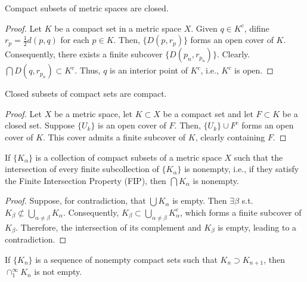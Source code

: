 \begin{theorem}[pma 2.34]
Compact subsets of metric spaces are closed.
\end{theorem}
\begin{proof}
Let $K$ be a compact set in a metric space $X$. Given $q\in K^c$, difine $r_p = \frac{1}{2}d(p,q)$ for each $p\in K$. Then, $\{D(p,r_p)\}$ forms an open cover of $K$. Consequently, there exists a finite subcover $\{D(p_n,r_{p_n})\}$. Clearly. $\bigcap D(q,r_{p_n}) \subset K^c$. Thus, $q$ is an interior point of $K^c$, i.e., $K^c$ is open.
\end{proof}

\begin{theorem}[pma 2.35] \label{thm:closed_subset_implies_compact}
Closed subsets of compact sets are compact.
\end{theorem}
\begin{proof}
Let $X$ be a metric space, let $K\subset X$ be a compact set and let $F\subset K$ be a closed set. Suppose $\{U_k\}$ is an open cover of $F$. Then, $\{U_k\} \cup F^c$ forms an open cover of $K$. This cover admits a finite subcover of $K$, clearly containing $F$.
\end{proof}

\begin{theorem}[pma 2.36] \label{thm:fip_implies_nonempty}
If $\{K_\alpha\}$ is a collection of compact subsets of a metric space $X$ such that the intersection of every finite subcollection of $\{K_\alpha\}$ is nonempty, i.e., if they satisfy the Finite Intersection Property (FIP), then $\bigcap K_\alpha$ is nonempty.
\end{theorem}
\begin{proof}
Suppose, for contradiction, that $\bigcup K_\alpha$ is empty. Then $\exists \beta$ s.t. $K_\beta \not\subset \bigcup_{\alpha\neq \beta}K_\alpha$. Consequently, $K_\beta \subset \bigcup_{\alpha\neq\beta}K_\alpha^c$, which forms a finite subcover of $K_\beta$. Therefore, the intersection of its complement and $K_\beta$ is empty, leading to a contradiction.
\end{proof}

\begin{corollary}[pma 2.36]
If $\{K_n\}$ is a sequence of nonempty compact sets such that $K_n\supset K_{n+1}$, then $\cap_1^\infty K_n$ is not empty.
\end{corollary}

